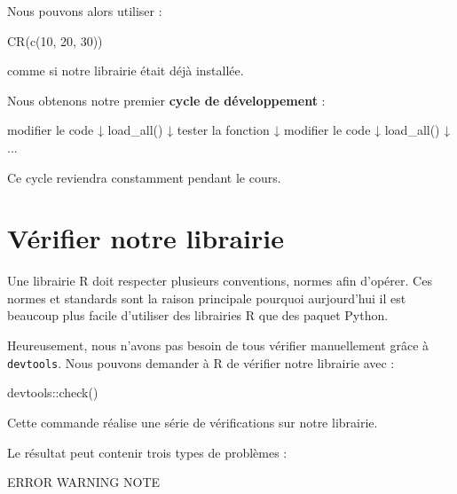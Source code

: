 \documentclass[
  letterpaper,
  DIV=11,
  numbers=noendperiod]{scrreprt}
\newenvironment{Shaded}{\begin{snugshade}}{\end{snugshade}}
\newcommand{\DecValTok}[1]{\textcolor[rgb]{0.68,0.00,0.00}{#1}}
\newcommand{\FunctionTok}[1]{\textcolor[rgb]{0.28,0.35,0.67}{#1}}
\newcommand{\NormalTok}[1]{\textcolor[rgb]{0.00,0.23,0.31}{#1}}
\newcommand{\SpecialCharTok}[1]{\textcolor[rgb]{0.37,0.37,0.37}{#1}}
\begin{document}
Nous pouvons alors utiliser :

\begin{Shaded}
\begin{Highlighting}[]
\FunctionTok{CR}\NormalTok{(}\FunctionTok{c}\NormalTok{(}\DecValTok{10}\NormalTok{, }\DecValTok{20}\NormalTok{, }\DecValTok{30}\NormalTok{))}
\end{Highlighting}
\end{Shaded}

comme si notre librairie était déjà installée.

Nous obtenons notre premier \textbf{cycle de développement} :

\begin{Shaded}
\begin{Highlighting}[]
\NormalTok{modifier le code}
\NormalTok{       ↓}
\NormalTok{   load\_all()}
\NormalTok{       ↓}
\NormalTok{tester la fonction}
\NormalTok{       ↓}
\NormalTok{modifier le code}
\NormalTok{       ↓}
\NormalTok{   load\_all()}
\NormalTok{       ↓}
\NormalTok{      ...}
\end{Highlighting}
\end{Shaded}

Ce cycle reviendra constamment pendant le cours.

\section{Vérifier notre librairie}\label{vuxe9rifier-notre-librairie}

Une librairie R doit respecter plusieurs conventions, normes afin
d'opérer. Ces normes et standards sont la raison principale pourquoi
aurjourd'hui il est beaucoup plus facile d'utiliser des librairies R que
des paquet Python.

Heureusement, nous n'avons pas besoin de tous vérifier manuellement
grâce à \texttt{devtools}. Nous pouvons demander à R de vérifier notre
librairie avec :

\begin{Shaded}
\begin{Highlighting}[]
\NormalTok{devtools}\SpecialCharTok{::}\FunctionTok{check}\NormalTok{()}
\end{Highlighting}
\end{Shaded}

Cette commande réalise une série de vérifications sur notre librairie.

Le résultat peut contenir trois types de problèmes :

\begin{Shaded}
\begin{Highlighting}[]
\NormalTok{ERROR}
\NormalTok{WARNING}
\NormalTok{NOTE}
\end{Highlighting}
\end{Shaded}
\end{document}
